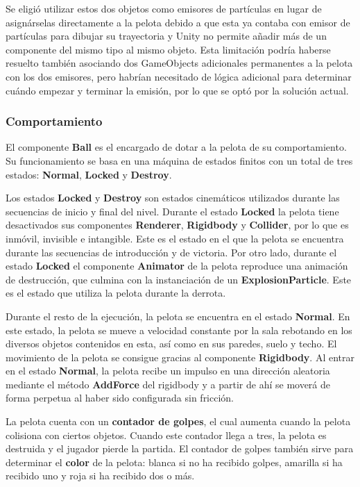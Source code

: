 Se eligió utilizar estos dos objetos como emisores de partículas en lugar de asignárselas directamente a la pelota debido a que esta ya contaba con emisor de partículas para dibujar su trayectoria y Unity no permite añadir más de un componente del mismo tipo al mismo objeto. Esta limitación podría haberse resuelto también asociando dos GameObjects adicionales permanentes a la pelota con los dos emisores, pero habrían necesitado de lógica adicional para determinar cuándo empezar y terminar la emisión, por lo que se optó por la solución actual.

\subsubsection{Comportamiento}
El componente \textbf{Ball} es el encargado de dotar a la pelota de su comportamiento. Su funcionamiento se basa en una máquina de estados finitos con un total de tres estados: \textbf{Normal}, \textbf{Locked} y \textbf{Destroy}.

Los estados \textbf{Locked} y \textbf{Destroy} son estados cinemáticos utilizados durante las secuencias de inicio y final del nivel. Durante el estado \textbf{Locked} la pelota tiene desactivados sus componentes \textbf{Renderer}, \textbf{Rigidbody} y \textbf{Collider}, por lo que es inmóvil, invisible e intangible. Este es el estado en el que la pelota se encuentra durante las secuencias de introducción y de victoria. Por otro lado, durante el estado \textbf{Locked} el componente \textbf{Animator} de la pelota reproduce una animación de destrucción, que culmina con la instanciación de un \textbf{ExplosionParticle}. Este es el estado que utiliza la pelota durante la derrota.

Durante el resto de la ejecución, la pelota se encuentra en el estado \textbf{Normal}. En este estado, la pelota se mueve a velocidad constante por la sala rebotando en los diversos objetos contenidos en esta, así como en sus paredes, suelo y techo. El movimiento de la pelota se consigue gracias al componente \textbf{Rigidbody}. Al entrar en el estado \textbf{Normal}, la pelota recibe un impulso en una dirección aleatoria mediante el método \textbf{AddForce} del rigidbody y a partir de ahí se moverá de forma perpetua al haber sido configurada sin fricción.

La pelota cuenta con un \textbf{contador de golpes}, el cual aumenta cuando la pelota colisiona con ciertos objetos. Cuando este contador llega a tres, la pelota es destruida y el jugador pierde la partida. El contador de golpes también sirve para determinar el \textbf{color} de la pelota: blanca si no ha recibido golpes, amarilla si ha recibido uno y roja si ha recibido dos o más. 

